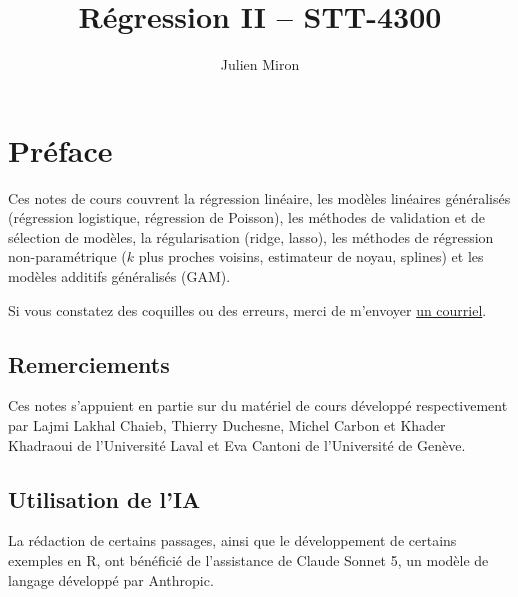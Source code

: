 \documentclass[
  french,
  letterpaper,
  DIV=11,
  numbers=noendperiod]{scrreprt}
\title{\textbf{Régression II -- STT-4300}}
\author{Julien Miron}
\date{}
\renewcommand*\contentsname{Table des matières}
\newcommand\contentsname{Table des matières}
\begin{document}
\maketitle

\renewcommand*\contentsname{Table des matières}
{
\setcounter{tocdepth}{2}
\tableofcontents
}


\chapter*{Préface}\label{pruxe9face}


Ces notes de cours couvrent la régression linéaire, les modèles
linéaires généralisés (régression logistique, régression de Poisson),
les méthodes de validation et de sélection de modèles, la régularisation
(ridge, lasso), les méthodes de régression non-paramétrique (\(k\) plus
proches voisins, estimateur de noyau, splines) et les modèles additifs
généralisés (GAM).

Si vous constatez des coquilles ou des erreurs, merci de m'envoyer
\href{mailto:julien.miron@mat.ulaval.ca}{un courriel}.

\section*{Remerciements}\label{remerciements}


Ces notes s'appuient en partie sur du matériel de cours développé
respectivement par Lajmi Lakhal Chaieb, Thierry Duchesne, Michel Carbon
et Khader Khadraoui de l'Université Laval et Eva Cantoni de l'Université
de Genève.

\section*{Utilisation de l'IA}\label{utilisation-de-lia}


La rédaction de certains passages, ainsi que le développement de
certains exemples en R, ont bénéficié de l'assistance de Claude Sonnet
5, un modèle de langage développé par Anthropic.

\end{document}
